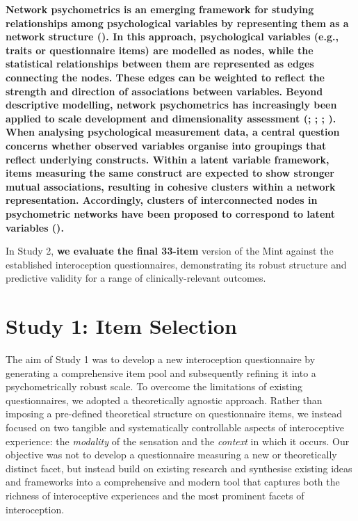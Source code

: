 \documentclass[
  man,
  floatsintext,
  longtable,
  nolmodern,
  notxfonts,
  notimes,
  mask,
  colorlinks=true,linkcolor=blue,citecolor=blue,urlcolor=blue]{apa7}
\begin{document}
\textbf{Network psychometrics is an emerging framework for studying
relationships among psychological variables by representing them as a
network structure (). In this approach, psychological variables (e.g., traits or
questionnaire items) are modelled as nodes, while the statistical
relationships between them are represented as edges connecting the
nodes. These edges can be weighted to reflect the strength and direction
of associations between variables. Beyond descriptive modelling, network
psychometrics has increasingly been applied to scale development and
dimensionality assessment
(;
;
;
). When analysing
psychological measurement data, a central question concerns whether
observed variables organise into groupings that reflect underlying
constructs. Within a latent variable framework, items measuring the same
construct are expected to show stronger mutual associations, resulting
in cohesive clusters within a network representation. Accordingly,
clusters of interconnected nodes in psychometric networks have been
proposed to correspond to latent variables
().}

In Study 2, \textbf{we evaluate the final 33-item} version of the Mint
against the established interoception questionnaires, demonstrating its
robust structure and predictive validity for a range of
clinically-relevant outcomes.

\section{Study 1: Item Selection}\label{study-1-item-selection}

The aim of Study 1 was to develop a new interoception questionnaire by
generating a comprehensive item pool and subsequently refining it into a
psychometrically robust scale. To overcome the limitations of existing
questionnaires, we adopted a theoretically agnostic approach. Rather
than imposing a pre-defined theoretical structure on questionnaire
items, we instead focused on two tangible and systematically
controllable aspects of interoceptive experience: the \emph{modality} of
the sensation and the \emph{context} in which it occurs. Our objective
was not to develop a questionnaire measuring a new or theoretically
distinct facet, but instead build on existing research and synthesise
existing ideas and frameworks into a comprehensive and modern tool that
captures both the richness of interoceptive experiences and the most
prominent facets of interoception.
\end{document}
